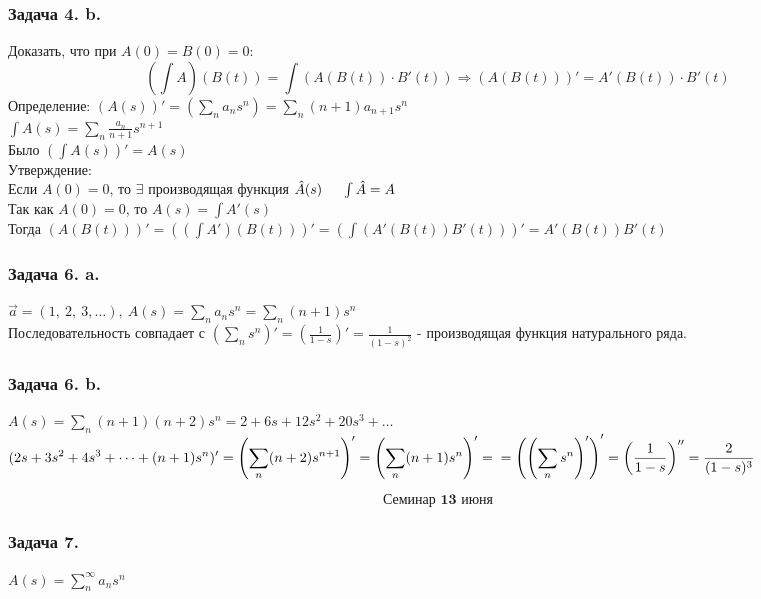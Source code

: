 \documentclass[12pt, letterpaper, twoside]{article}
\begin{document}
\subsubsection*{Задача 4. b.}
Доказать, что при $A(0) = B(0) = 0$:
\[\left(\int A\right)(B(t)) = \int(A(B(t))\cdot B'(t))\Rightarrow (A(B(t)))' = A'(B(t))\cdot B'(t)\]
Определение: $(A(s))' = \left(\displaystyle \sum_{n} a_n s^n \right) = \sum_{n} (n + 1)a_{n + 1}s^n$\\
$\displaystyle\int A(s) = \sum_{n} \frac{a_n}{n + 1}s^{n + 1}$\\
Было $\displaystyle\left(\int A(s)\right)' = A(s)$\\
Утверждение:\\
Если $A(0)=  0$, то $\exists$ производящая функция $\hat{A}(s)\hspace{0.5cm} \int\hat{A} = A$\\
Так как $A(0) = 0$, то $A(s) = \int A'(s)$\\
Тогда $(A(B(t)))' = \left( (\int A')(B(t)) \right)' = (\int (A'(B(t)) B'(t)))' = A'(B(t))B'(t)$

\subsubsection*{Задача 6. a.}
$\vec{a} = (1,\ 2,\ 3,\dots),\ A(s) = \displaystyle\sum_n a_n s^n = \sum_{n} (n + 1)s^n$\\
Последовательность совпадает с $\displaystyle\left(\sum_{n} s^{n}\right)' = \left( \frac{1}{1 - s} \right)' = \frac{1}{(1 - s)^2}$ - производящая функция натурального ряда.

\subsubsection*{Задача 6. b.}
$A(s) = \displaystyle \sum_n (n + 1)(n + 2)s^n = 2 + 6s + 12 s^2 + 20 s^3 + \dots$\\
$\displaystyle (2s + 3s^2 + 4s^3 + \dots + (n + 1)s^n)' = \left( \sum_{n} (n + 2)s^{n + 1} \right)' = \left( \sum_{n} (n + 1)s^{n} \right)' =\\
= \left( \left(\sum_{n} s^n \right)' \right)' = \left( \frac{1}{1 - s} \right)'' = \frac{2}{(1 - s)^3}$

\[\textbf{Семинар 13 июня}\]

\subsubsection*{Задача 7.}
$A(s) = \displaystyle \sum_{n}^{\infty} a_n s^n$
\end{document}
